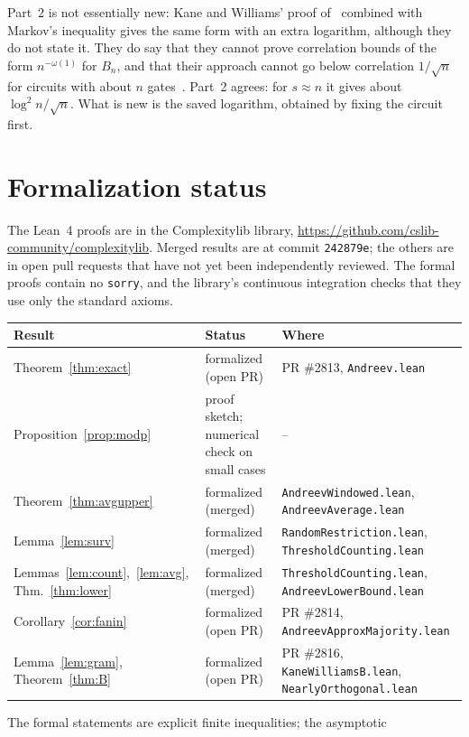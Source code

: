 \documentclass[11pt,letterpaper]{article}
\theoremstyle{remark}
\newcommand{\sect}[1]{\section{\texorpdfstring{\color{ink}#1}{#1}}}
\begin{document}
Part~2 is not essentially new: Kane and Williams' proof
of~\cite[Cor.~6.2]{KW} combined with Markov's inequality gives the same form
with an extra logarithm, although they do not state it. They do say that they
cannot prove correlation bounds of the form $n^{-\omega(1)}$ for $B_n$, and
that their approach cannot go below correlation $1/\sqrt n$ for circuits with
about $n$ gates~\cite[Section~6]{KW}. Part~2 agrees: for $s\approx n$ it
gives about $\log^2n/\sqrt n$. What is new is the saved logarithm, obtained
by fixing the circuit first.

\sect{Formalization status}\label{sec:lean}

The Lean~4 proofs are in the Complexitylib library,
\url{https://github.com/cslib-community/complexitylib}. Merged results are at
commit \texttt{242879e}; the others are in open pull requests that have not
yet been independently reviewed. The formal proofs contain no
\texttt{sorry}, and the library's continuous integration checks that they use
only the standard axioms.
\begin{center}
\small
\renewcommand{\arraystretch}{1.2}
\begin{tabular}{@{}P{0.29\textwidth}P{0.25\textwidth}P{0.39\textwidth}@{}}
\toprule
Result & Status & Where\\
\midrule
Theorem~\ref{thm:exact} & formalized (open PR) & PR \#2813, \texttt{Andreev.lean}\\
Proposition~\ref{prop:modp} & proof sketch; numerical check on small cases & --\\
Theorem~\ref{thm:avgupper} & formalized (merged) & \texttt{AndreevWindowed.lean}, \texttt{AndreevAverage.lean}\\
Lemma~\ref{lem:surv} & formalized (merged) & \texttt{RandomRestriction.lean}, \texttt{ThresholdCounting.lean}\\
Lemmas~\ref{lem:count},~\ref{lem:avg}, Thm.~\ref{thm:lower} & formalized (merged) & \texttt{ThresholdCounting.lean}, \texttt{AndreevLowerBound.lean}\\
Corollary~\ref{cor:fanin} & formalized (open PR) & PR \#2814, \texttt{AndreevApproxMajority.lean}\\
Lemma~\ref{lem:gram}, Theorem~\ref{thm:B} & formalized (open PR) & PR \#2816, \texttt{KaneWilliamsB.lean}, \texttt{NearlyOrthogonal.lean}\\
\bottomrule
\end{tabular}
\end{center}
The formal statements are explicit finite inequalities; the asymptotic
\end{document}
